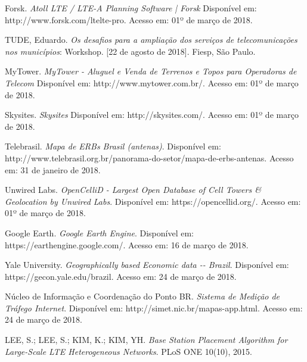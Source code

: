 \documentclass[]{politex}
\begin{document}
%

%

\begin{thebibliography}{9}

    Forsk.
    \textit{Atoll LTE / LTE-A Planning Software | Forsk}
    Disponível em: http://www.forsk.com/ltelte-pro.
    Acesso em: 01º de março de 2018.

    TUDE, Eduardo.
    \textit{Os desafios para a ampliação dos serviços de telecomunicações nos
    municípios}: Workshop.
    [22 de agosto de 2018].
    Fiesp, São Paulo.

    MyTower.
    \textit{MyTower - Aluguel e Venda de Terrenos e Topos para
    Operadoras de Telecom}
    Disponível em: http://www.mytower.com.br/.
    Acesso em: 01º de março de 2018.

    Skysites.
    \textit{Skysites}
    Disponível em: http://skysites.com/.
    Acesso em: 01º de março de 2018.

    Telebrasil.
    \textit{Mapa de ERBs Brasil (antenas)}.
    Disponível em:
    http://www.telebrasil.org.br/panorama-do-setor/mapa-de-erbs-antenas.
    Acesso em: 31 de janeiro de 2018.

    Unwired Labs.
    \textit{OpenCelliD - Largest Open Database of Cell Towers \&
    Geolocation by Unwired Labs}.
    Disponível em: https://opencellid.org/.
    Acesso em: 01º de março de 2018.

    Google Earth.
    \textit{Google Earth Engine}.
    Disponível em: https://earthengine.google.com/.
    Acesso em: 16 de março de 2018.

    Yale University.
    \textit{Geographically based Economic data -{}- Brazil}.
    Disponível em: https://gecon.yale.edu/brazil.
    Acesso em: 24 de março de 2018.

    Núcleo de Informação e Coordenação do Ponto BR.
    \textit{Sistema de Medição de Tráfego Internet}.
    Disponível em: http://simet.nic.br/mapas-app.html.
    Acesso em: 24 de março de 2018.

    LEE, S.; LEE, S.; KIM, K.; KIM, YH.
    \textit{Base Station Placement Algorithm for Large-Scale LTE
    Heterogeneous Networks}.
    PLoS ONE 10(10), 2015.


\end{thebibliography}
\end{document}
